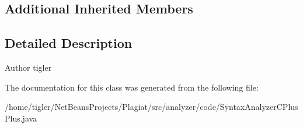 \subsection*{Additional Inherited Members}


\subsection{Detailed Description}
\begin{DoxyAuthor}{Author}
tigler 
\end{DoxyAuthor}


The documentation for this class was generated from the following file\+:\begin{DoxyCompactItemize}
\item 
/home/tigler/\+Net\+Beans\+Projects/\+Plagiat/src/analyzer/code/Syntax\+Analyzer\+C\+Plus\+Plus.\+java\end{DoxyCompactItemize}
